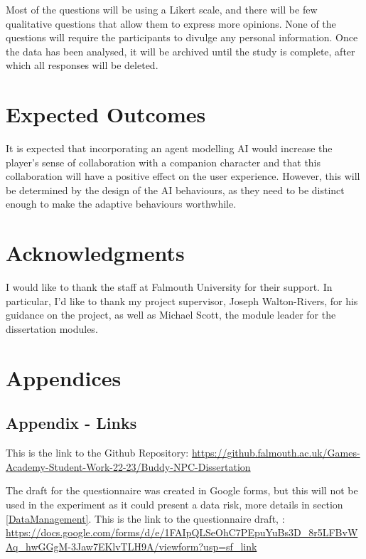\documentclass{IEEEtran}
\begin{document}
Most of the questions will be using a Likert scale, and there will be few qualitative questions that allow them to express more opinions. None of the questions will require the participants to divulge any personal information. Once the data has been analysed, it will be archived until the study is complete, after which all responses will be deleted.

\section{Expected Outcomes}
\label{ExpectedOutcomes}

It is expected that incorporating an agent modelling AI would increase the player's sense of collaboration with a companion character and that this collaboration will have a positive effect on the user experience. However, this will be determined by the design of the AI behaviours, as they need to be distinct enough to make the adaptive behaviours worthwhile.

\section*{Acknowledgments}

I would like to thank the staff at Falmouth University for their support. In particular, I'd like to thank my project supervisor, Joseph Walton-Rivers, for his guidance on the project, as well as Michael Scott, the module leader for the dissertation modules.



 

 \newpage
 
\section{Appendices}
\label{Appendices}

\subsection{Appendix - Links}
\label{AppendixLinks}

This is the link to the Github Repository: \url{https://github.falmouth.ac.uk/Games-Academy-Student-Work-22-23/Buddy-NPC-Dissertation}

The draft for the questionnaire was created in Google forms, but this will not be used in the experiment as it could present a data risk, more details in section \ref{DataManagement}. This is the link to the questionnaire draft, : \url{https://docs.google.com/forms/d/e/1FAIpQLSeOhC7PEpuYuBs3D_8r5LFBvWAq_hwGGgM-3Jaw7EKlvTLH9A/viewform?usp=sf_link}
\end{document}
